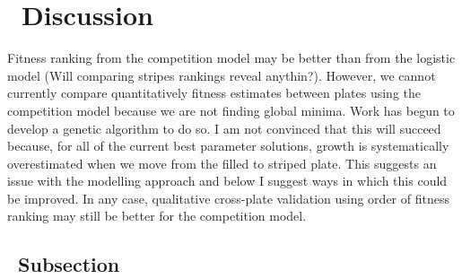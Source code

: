 \graphicspath{{images/}}

\section{\thesection~Discussion}
\label{sec:discussion}

Fitness ranking from the competition model may be better than from the
logistic model (Will comparing stripes rankings reveal
anythin?). However, we cannot currently compare quantitatively fitness
estimates between plates using the competition model because we are
not finding global minima. Work has begun to develop a genetic
algorithm to do so. I am not convinced that this will succeed because,
for all of the current best parameter solutions, growth is
systematically overestimated when we move from the filled to striped
plate. This suggests an issue with the modelling approach and below I
suggest ways in which this could be improved. In any case, qualitative
cross-plate validation using order of fitness ranking may still be
better for the competition model.



\subsection{\thesubsection~Subsection}


